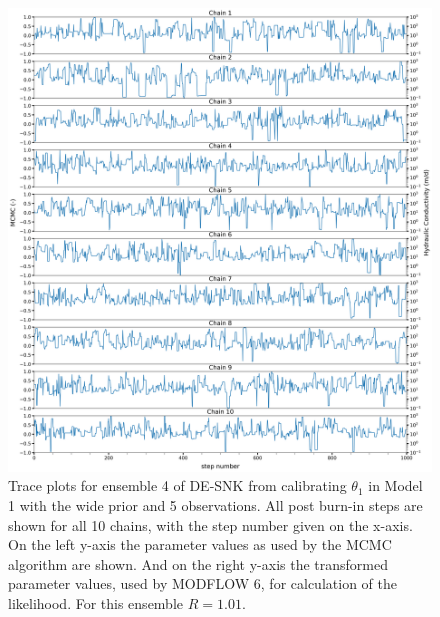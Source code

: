 \begin{figure}[ht]
\centering
\includegraphics[width=1.0\textwidth]{Figures/appendix_figs/trace_plots_ensemble4_DEsnooker priorbroad.png}
\caption{Trace plots for ensemble 4 of DE-SNK from calibrating  $\theta_1$ in Model 1 with the wide prior and 5 observations. All post burn-in steps are shown for all 10 chains, with the step number given on the x-axis. On the left y-axis the parameter values as used by the MCMC algorithm are shown. And on the right y-axis the transformed parameter values, used by MODFLOW 6, for calculation of the likelihood. For this ensemble $\hat{R}=1.01$.}\label{traceplot_DE-SNK_priorbroad}
\end{figure}

